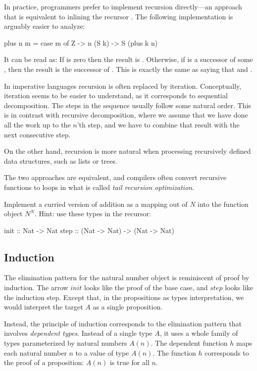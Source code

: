 \documentclass[DaoFP]{subfiles}
\begin{document}
In practice, programmers prefer to implement recursion directly---an approach that is equivalent to inlining the recursor . The following implementation is arguably easier to analyze:
\begin{haskell}
plus n m = case m of
  Z -> n
  (S k) -> S (plus k n)
\end{haskell}
It can be read as: If  is zero then the result is . Otherwise, if  is a successor of some , then the result is the successor of  . This is exactly the same as saying that  and .

In imperative languages recursion is often replaced by iteration. Conceptually, iteration seems to be easier to understand, as it corresponds to sequential decomposition. The steps in the sequence usually follow some natural order. This is in contrast with recursive decomposition, where we assume that we have done all the work up to the $n$'th step, and we have to combine that result with the next consecutive step. 

On the other hand, recursion is more natural when processing recursively defined data structures, such as lists or trees. 

The two approaches are equivalent, and compilers often convert recursive functions to loops in what is called \emph{tail recursion optimization}.

\begin{exercise}
Implement a curried version of addition as a mapping out of $N$ into the function object $N^N$. Hint: use these types in the recursor:
\begin{haskell}
init :: Nat -> Nat
step :: (Nat -> Nat) -> (Nat -> Nat)
\end{haskell}

\end{exercise}


\subsection{Induction}

The elimination pattern for the natural number object is reminiscent of proof by induction. The arrow $init$ looks like the proof of the base case, and $step$ looks like the induction step. Except that, in the propositions as types interpretation, we would interpret the target $A$ as a single proposition. 

Instead, the principle of induction corresponds to the elimination pattern that involves \emph{dependent types}. Instead of a single type $A$, it uses a whole family of types parameterized by natural numbers $A(n)$. The dependent function $h$ maps each natural number $n$ to a value of type $A(n)$. The function $h$ corresponds to the proof of a proposition: $A(n)$ is true for all $n$. 
\end{document}

